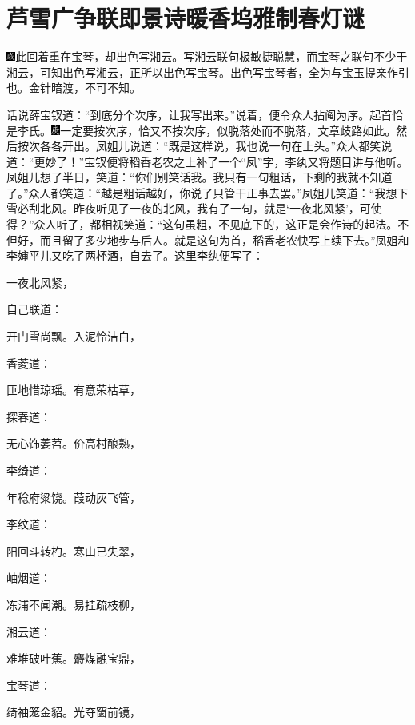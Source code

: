 

\chapter{芦雪广争联即景诗\hspace{.5em}暖香坞雅制春灯谜}

{\includegraphics[width=3mm]{../Images/00005}此回着重在宝琴，却出色写湘云。写湘云联句极敏捷聪慧，而宝琴之联句不少于湘云，可知出色写湘云，正所以出色写宝琴。出色写宝琴者，全为与宝玉提亲作引也。金针暗渡，不可不知。}

话说薛宝钗道：``到底分个次序，让我写出来。''说着，便令众人拈阄为序。起首恰是李氏。{\includegraphics[width=3mm]{../Images/00004}一定要按次序，恰又不按次序，似脱落处而不脱落，文章歧路如此。}然后按次各各开出。凤姐儿说道：``既是这样说，我也说一句在上头。''众人都笑说道：``更妙了！''宝钗便将稻香老农之上补了一个``凤''字，李纨又将题目讲与他听。凤姐儿想了半日，笑道：``你们别笑话我。我只有一句粗话，下剩的我就不知道了。''众人都笑道：``越是粗话越好，你说了只管干正事去罢。''凤姐儿笑道：``我想下雪必刮北风。昨夜听见了一夜的北风，我有了一句，就是`一夜北风紧'，可使得？''众人听了，都相视笑道：``这句虽粗，不见底下的，这正是会作诗的起法。不但好，而且留了多少地步与后人。就是这句为首，稻香老农快写上续下去。''凤姐和李婶平儿又吃了两杯酒，自去了。这里李纨便写了：

一夜北风紧，

自己联道：

开门雪尚飘。入泥怜洁白，

香菱道：

匝地惜琼瑶。有意荣枯草，

探春道：

无心饰萎苕。价高村酿熟，

李绮道：

年稔府粱饶。葭动灰飞管，

李纹道：

阳回斗转杓。寒山已失翠，

岫烟道：

冻浦不闻潮。易挂疏枝柳，

湘云道：

难堆破叶蕉。麝煤融宝鼎，

宝琴道：

绮袖笼金貂。光夺窗前镜，


